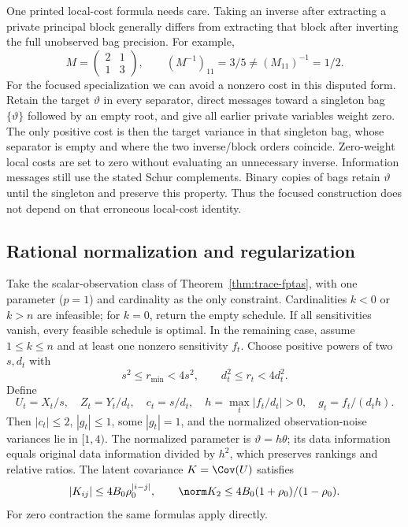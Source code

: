One printed local-cost formula needs care. Taking an inverse after extracting
a private principal block generally differs from extracting that block after
inverting the full unobserved bag precision. For example,
\[
 M=\begin{pmatrix}2&1\\1&3\end{pmatrix},\qquad
 (M^{-1})_{11}=3/5\ne (M_{11})^{-1}=1/2.
\]
For the focused specialization we can avoid a nonzero cost in this disputed
form. Retain the target $\vartheta$ in every separator, direct messages
toward a singleton bag $\{\vartheta\}$ followed by an empty root, and give
all earlier private variables weight zero. The only positive cost is then
the target variance in that singleton bag, whose separator is empty and
where the two inverse/block orders coincide. Zero-weight local costs are
set to zero without evaluating an unnecessary inverse. Information messages
still use the stated Schur complements. Binary copies of bags retain
$\vartheta$ until the singleton and preserve this property. Thus the
focused construction does not depend on that erroneous local-cost identity.

\subsection{Rational normalization and regularization}
Take the scalar-observation class of Theorem~\ref{thm:trace-fptas}, with one
parameter ($p=1$) and cardinality as the only constraint. Cardinalities $k<0$
or $k>n$ are infeasible; for $k=0$, return the empty schedule. If all
sensitivities vanish, every feasible schedule is optimal. In the remaining
case, assume $1\le k\le n$ and at least one nonzero sensitivity $f_t$.
Choose positive powers of two $s,d_t$ with
\[
 s^2\le r_{\min}<4s^2,\qquad d_t^2\le r_t<4d_t^2.
\]
Define
\[
 U_t=X_t/s,\quad Z_t=Y_t/d_t,\quad c_t=s/d_t,
 \quad h=\max_t|f_t/d_t|>0,\quad g_t=f_t/(d_th).
\]
Then $|c_t|\le2$, $|g_t|\le1$, some $|g_t|=1$, and the normalized
observation-noise variances lie in $[1,4)$. The normalized parameter is
$\vartheta=h\theta$; its data information equals original data information
divided by $h^2$, which preserves rankings and relative ratios. The latent
covariance $K=\Cov(U)$ satisfies
\[
 |K_{ij}|\le4B_0\rho_0^{|i-j|},\qquad
 \norm K_2\le4B_0(1+\rho_0)/(1-\rho_0).
\]
For zero contraction the same formulas apply directly.

